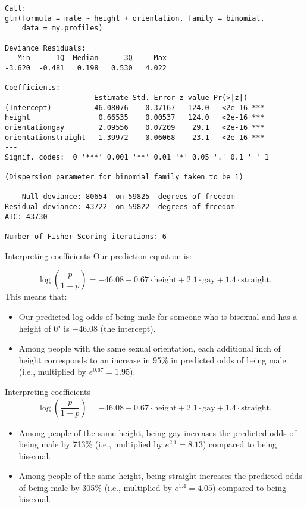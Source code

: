 \documentclass{beamer}\usepackage[]{graphicx}\usepackage[]{color}
\makeatletter
\newenvironment{kframe}{%
 \def\at@end@of@kframe{}%
 \ifinner\ifhmode%
  \def\at@end@of@kframe{\end{minipage}}%
  \begin{minipage}{\columnwidth}%
 \fi\fi%
 \def\FrameCommand##1{\hskip\@totalleftmargin \hskip-\fboxsep
 \colorbox{shadecolor}{##1}\hskip-\fboxsep
     \hskip-\linewidth \hskip-\@totalleftmargin \hskip\columnwidth}%
 \MakeFramed {\advance\hsize-\width
   \@totalleftmargin\z@ \linewidth\hsize
   \@setminipage}}%
 {\par\unskip\endMakeFramed%
 \at@end@of@kframe}
\newenvironment{knitrout}{}{} %
\makeatother
\begin{document}
\begin{darkframes}
\begin{frame}[fragile]
\begin{knitrout}
\begin{kframe}
\begin{verbatim}
Call:
glm(formula = male ~ height + orientation, family = binomial, 
    data = my.profiles)

Deviance Residuals: 
   Min      1Q  Median      3Q     Max  
-3.620  -0.481   0.198   0.530   4.022  

Coefficients:
                     Estimate Std. Error z value Pr(>|z|)    
(Intercept)         -46.08076    0.37167  -124.0   <2e-16 ***
height                0.66535    0.00537   124.0   <2e-16 ***
orientationgay        2.09556    0.07209    29.1   <2e-16 ***
orientationstraight   1.39972    0.06068    23.1   <2e-16 ***
---
Signif. codes:  0 '***' 0.001 '**' 0.01 '*' 0.05 '.' 0.1 ' ' 1

(Dispersion parameter for binomial family taken to be 1)

    Null deviance: 80654  on 59825  degrees of freedom
Residual deviance: 43722  on 59822  degrees of freedom
AIC: 43730

Number of Fisher Scoring iterations: 6
\end{verbatim}
\end{kframe}
\end{knitrout}
    \end{frame}

    \begin{frame}{Interpreting coefficients}
      Our prediction equation is:
      
      \[
        \log\left(\frac{p}{1-p}\right) =
          -46.08 +
          0.67\cdot\text{height} +
          2.1\cdot\text{gay} +
          1.4\cdot\text{straight}.
      \]
      This means that:
      \begin{itemize}[<+->]
        \item Our predicted log odds of being male for someone who is bisexual and has a height of 0" is $-46.08$ (the intercept).
        \item Among people with the same sexual orientation, each additional inch of height corresponds to an increase in 95\% in predicted odds of being male (i.e., multiplied by $e^{0.67} = 1.95$).
      \end{itemize}
    \end{frame}

    \begin{frame}{Interpreting coefficients}
      \[
        \log\left(\frac{p}{1-p}\right) =
          -46.08 +
          0.67\cdot\text{height} +
          2.1\cdot\text{gay} +
          1.4\cdot\text{straight}.
      \]
      \begin{itemize}[<+->]
        \item Among people of the same height, being gay increases the predicted odds of being male by 713\% (i.e., multiplied by $e^{2.1} = 8.13$) compared to being bisexual.
        \item Among people of the same height, being straight increases the predicted odds of being male by 305\% (i.e., multiplied by $e^{1.4} = 4.05$) compared to being bisexual.
      \end{itemize}
    \end{frame}


\end{darkframes}
\end{document}
